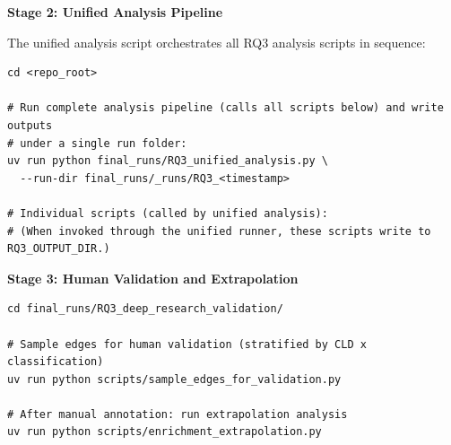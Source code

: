 \textbf{Stage 2: Unified Analysis Pipeline}

The unified analysis script orchestrates all RQ3 analysis scripts in sequence:

\begin{verbatim}
cd <repo_root>

# Run complete analysis pipeline (calls all scripts below) and write outputs
# under a single run folder:
uv run python final_runs/RQ3_unified_analysis.py \
  --run-dir final_runs/_runs/RQ3_<timestamp>

# Individual scripts (called by unified analysis):
# (When invoked through the unified runner, these scripts write to RQ3_OUTPUT_DIR.)
\end{verbatim}

\textbf{Stage 3: Human Validation and Extrapolation}

\begin{verbatim}
cd final_runs/RQ3_deep_research_validation/

# Sample edges for human validation (stratified by CLD x classification)
uv run python scripts/sample_edges_for_validation.py

# After manual annotation: run extrapolation analysis
uv run python scripts/enrichment_extrapolation.py
\end{verbatim}

